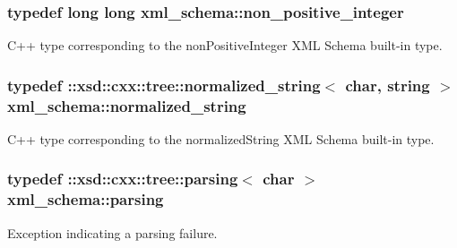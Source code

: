 \hypertarget{namespacexml__schema_a3de6073e510eb8edd71ddc6e0256e2f9}{}
\subsubsection[{non\+\_\+positive\+\_\+integer}]{\setlength{\rightskip}{0pt plus 5cm}typedef long long {\bf xml\+\_\+schema\+::non\+\_\+positive\+\_\+integer}}\label{namespacexml__schema_a3de6073e510eb8edd71ddc6e0256e2f9}


C++ type corresponding to the non\+Positive\+Integer X\+M\+L Schema built-\/in type. 

\hypertarget{namespacexml__schema_a429c44c2779bb6c82332127aa59c61fe}{}
\subsubsection[{normalized\+\_\+string}]{\setlength{\rightskip}{0pt plus 5cm}typedef \+::xsd\+::cxx\+::tree\+::normalized\+\_\+string$<$ char, {\bf string} $>$ {\bf xml\+\_\+schema\+::normalized\+\_\+string}}\label{namespacexml__schema_a429c44c2779bb6c82332127aa59c61fe}


C++ type corresponding to the normalized\+String X\+M\+L Schema built-\/in type. 

\hypertarget{namespacexml__schema_a150f88d7d2156ae81807b142038684f5}{}
\subsubsection[{parsing}]{\setlength{\rightskip}{0pt plus 5cm}typedef \+::xsd\+::cxx\+::tree\+::parsing$<$ char $>$ {\bf xml\+\_\+schema\+::parsing}}\label{namespacexml__schema_a150f88d7d2156ae81807b142038684f5}


Exception indicating a parsing failure. 

\hypertarget{namespacexml__schema_abe9d639a15a121d2868ae2f9c974ca24}{}
